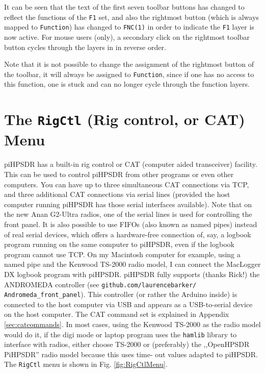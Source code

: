\documentclass[12pt]{book}
\def\bltt#1{\texttt{\color{blue}#1}}
\def\pH{pi\-HPSDR\xspace}
\begin{document}
It can be seen that the text of the first seven toolbar buttons has changed to reflect
the functions of the \texttt{F1} set, and also the rightmost button (which is always mapped
to \bltt{Function}) has changed to \texttt{FNC(1)} in order to indicate the \texttt{F1}
layer is now active. For mouse users (only), a secondary click on the rightmost toolbar
button cycles through the layers in in reverse order.

Note that it is not possible to change the assignment of the  rightmost button of the toolbar,
it will always be assigned to \bltt{Function}, since if one has no access to this
function, one is stuck and can no longer cycle through the function layers.

\section{The \texttt{RigCtl} (Rig control, or CAT) Menu}

\pH has a built-in rig control or CAT (computer aided transceiver) facility. This can be used to control
\pH from other programs or even other computers. You can have up to three simultaneous CAT connections
via TCP, and three additional CAT connections via serial lines (provided the host computer running \pH
has those serial interfaces available). Note that on the new Anan G2-Ultra radios, one of the serial lines
is used for controlling the front panel.
It is also possible to use FIFOs (also known as named pipes) instead of real serial devices, which offers a
hardware-free connection
of, say, a logbook program running on the same computer to \pH, even if the logbook program cannot use
TCP. On my Macintosh computer for example, using a named pipe and the Kenwood TS-2000 radio model,
I can connect the MacLogger DX logbook program with \pH.
\pH fully supports (thanks Rick!) the ANDROMEDA controller (see \texttt{github.com/laurencebarker/
Andromeda\_front\_panel}).
This controller (or rather the Arduino inside) is connected to the host computer via USB and appears as a
USB-to-serial
device on the host computer. The CAT command set is explained in Appendix \ref{sec:catcommands}. In most
cases, using
the Kenwood TS-2000 as the radio model would do it, if the digi mode or laptop program uses the \texttt{hamlib} library  to
interface with
radios, either choose TS-2000 or (preferably) the ,,OpenHPSDR PiHPSDR'' radio model because this uses time-
out values
adapted to \pH. The \bltt{RigCtl} menu is shown in Fig. \ref{fig:RigCtlMenu}.
\end{document}
